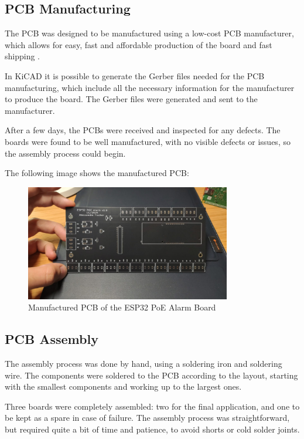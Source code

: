\documentclass[a4paper,12pt]{article}
\begin{document}
\subsection{PCB Manufacturing}

The PCB was designed to be manufactured using a low-cost PCB manufacturer, which allows for easy, fast and affordable production of the board and fast shipping \cite{PCBPrototypePCB}.

In KiCAD it is possible to generate the Gerber files needed for the PCB manufacturing, which include all the necessary information for the manufacturer to produce the board. The Gerber files were generated and sent to the manufacturer.

After a few days, the PCBs were received and inspected for any defects. The boards were found to be well manufactured, with no visible defects or issues, so the assembly process could begin.

The following image shows the manufactured PCB:
\begin{figure}[H]
    \centering
    \includegraphics[width=0.8\textwidth]{Media/PCB_Manufactured.jpg}
    \caption{Manufactured PCB of the ESP32 PoE Alarm Board}
    \label{fig:manufactured_pcb}
\end{figure}

\subsection{PCB Assembly}

The assembly process was done by hand, using a soldering iron and soldering wire. The components were soldered to the PCB according to the layout, starting with the smallest components and working up to the largest ones. 

Three boards were completely assembled: two for the final application, and one to be kept as a spare in case of failure.
The assembly process was straightforward, but required quite a bit of time and patience, to avoid shorts or cold solder joints.
\end{document}
